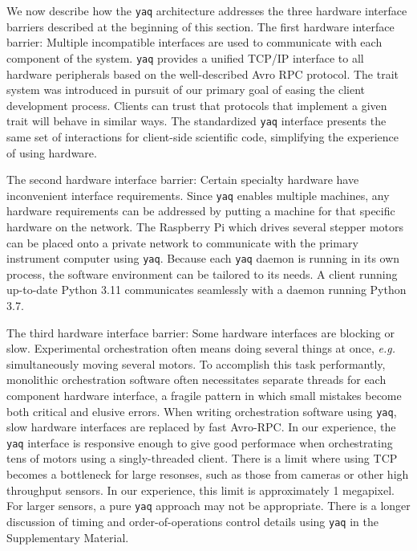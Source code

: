 \documentclass[aip, amsmath, amssymb, reprint,]{revtex4-2}
\newcommand\yaq{\texttt{yaq}}
\begin{document}
We now describe how the \yaq{} architecture addresses the three hardware interface barriers described at the beginning of this section.
The first hardware interface barrier: Multiple incompatible interfaces are used to communicate with each component of the system. %
\yaq{} provides a unified TCP/IP interface to all hardware peripherals based on the well-described Avro RPC protocol.
The trait system was introduced in pursuit of our primary goal of easing the client development process.
Clients can trust that protocols that implement a given trait will behave in similar ways.
The standardized \yaq{} interface presents the same set of interactions for client-side scientific code, simplifying the experience of using hardware.

The second hardware interface barrier: Certain specialty hardware have inconvenient interface requirements.
Since \yaq{} enables multiple machines, any hardware requirements can be addressed by putting a machine for that specific hardware on the network.
The Raspberry Pi which drives several stepper motors can be placed onto a private network to communicate with the primary instrument computer using \yaq{}.
Because each \yaq{} daemon is running in its own process, the software environment can be tailored to its needs.
A client running up-to-date Python 3.11 communicates seamlessly with a daemon running Python 3.7.

The third hardware interface barrier: Some hardware interfaces are blocking or slow.
Experimental orchestration often means doing several things at once, \textit{e.g.} simultaneously moving several motors.
To accomplish this task performantly, monolithic orchestration software often necessitates separate threads for each component hardware interface, a fragile pattern in which small mistakes become both critical and elusive errors.
When writing orchestration software using \yaq{}, slow hardware interfaces are replaced by fast Avro-RPC.
In our experience, the \yaq{} interface is responsive enough to give good performace when orchestrating tens of motors using a singly-threaded client.
There is a limit where using TCP becomes a bottleneck for large resonses, such as those from cameras or other high throughput sensors.
In our experience, this limit is approximately 1 megapixel.
For larger sensors, a pure \yaq{} approach may not be appropriate.
There is a longer discussion of timing and order-of-operations control details using \yaq{} in the Supplementary Material.
\end{document}
